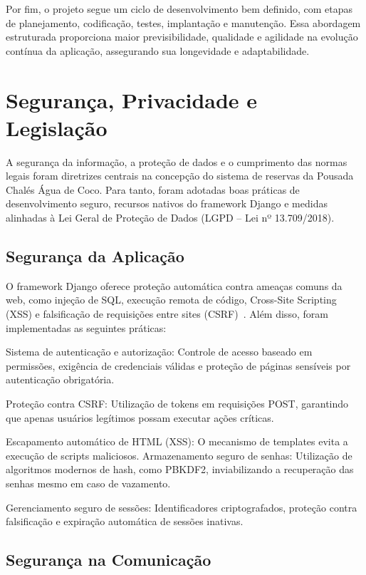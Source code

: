 \documentclass[
	12pt,				%
	openany,			%
	twoside,			%
	a4paper,			%
	english,			%
	french,				%
	spanish,			%
	brazil				%
	]{abntex2}
\begin{document}
Por fim, o projeto segue um ciclo de desenvolvimento bem definido, com etapas de planejamento, codificação, testes, implantação e manutenção. Essa abordagem estruturada proporciona maior previsibilidade, qualidade e agilidade na evolução contínua da aplicação, assegurando sua longevidade e adaptabilidade.

\section{Segurança, Privacidade e Legislação}

A segurança da informação, a proteção de dados e o cumprimento das normas legais foram diretrizes centrais na concepção do sistema de reservas da Pousada Chalés Água de Coco. Para tanto, foram adotadas boas práticas de desenvolvimento seguro, recursos nativos do framework Django e medidas alinhadas à Lei Geral de Proteção de Dados (LGPD – Lei nº 13.709/2018).

\subsection{Segurança da Aplicação}

O framework Django oferece proteção automática contra ameaças comuns da web, como injeção de SQL, execução remota de código, Cross-Site Scripting (XSS) e falsificação de requisições entre sites (CSRF)~\cite{django}. Além disso, foram implementadas as seguintes práticas:

Sistema de autenticação e autorização: Controle de acesso baseado em permissões, exigência de credenciais válidas e proteção de páginas sensíveis por autenticação obrigatória.

Proteção contra CSRF: Utilização de tokens em requisições POST, garantindo que apenas usuários legítimos possam executar ações críticas.

Escapamento automático de HTML (XSS): O mecanismo de templates evita a execução de scripts maliciosos.
Armazenamento seguro de senhas: Utilização de algoritmos modernos de hash, como PBKDF2, inviabilizando a recuperação das senhas mesmo em caso de vazamento.

Gerenciamento seguro de sessões: Identificadores criptografados, proteção contra falsificação e expiração automática de sessões inativas.


\subsection{Segurança na Comunicação}
\end{document}
